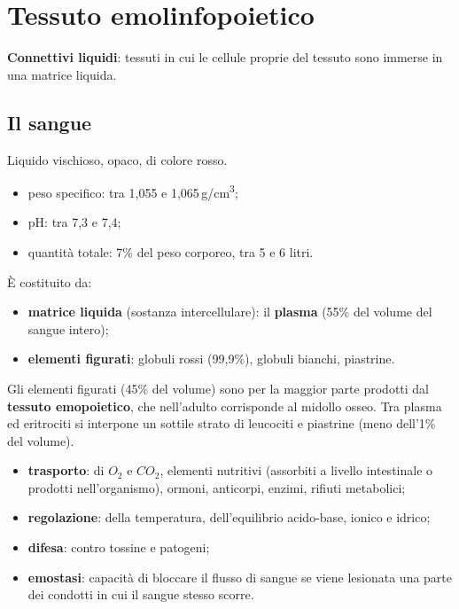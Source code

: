 \section{Tessuto emolinfopoietico}

\textbf{Connettivi liquidi}: tessuti in cui le cellule proprie del tessuto sono immerse in una matrice liquida.

\subsection{Il sangue}

Liquido vischioso, opaco, di colore rosso.
\begin{itemize}
  \item peso specifico: tra 1,055 e 1,065\,g/cm\textsuperscript{3};
  \item pH: tra 7,3 e 7,4;
  \item quantità totale: 7\% del peso corporeo, tra 5 e 6 litri.
\end{itemize}

È costituito da:
\begin{itemize}
  \item \textbf{matrice liquida} (sostanza intercellulare): il \textbf{plasma} (55\% del volume del sangue intero);
  \item \textbf{elementi figurati}: globuli rossi (99,9\%), globuli bianchi, piastrine.
\end{itemize}
Gli elementi figurati (45\% del volume) sono per la maggior parte prodotti dal \textbf{tessuto emopoietico}, che nell'adulto corrisponde al midollo osseo. Tra plasma ed eritrociti si interpone un sottile strato di leucociti e piastrine (meno dell'1\% del volume).

\begin{itemize}
  \item \textbf{trasporto}: di $O_2$ e $CO_2$, elementi nutritivi (assorbiti a livello intestinale o prodotti nell'organismo), ormoni, anticorpi, enzimi, rifiuti metabolici;
  \item \textbf{regolazione}: della temperatura, dell'equilibrio acido-base, ionico e idrico;
  \item \textbf{difesa}: contro tossine e patogeni;
  \item \textbf{emostasi}: capacità di bloccare il flusso di sangue se viene lesionata una parte dei condotti in cui il sangue stesso scorre.
\end{itemize}

